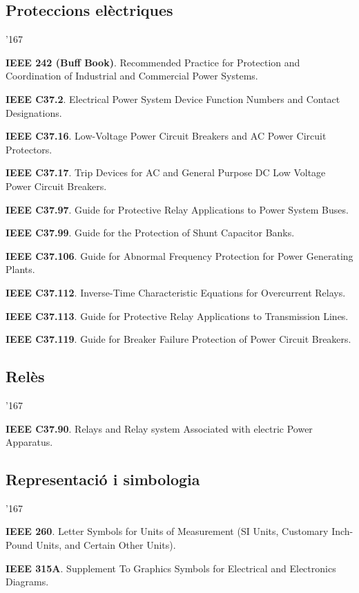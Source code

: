 \subsection*{Proteccions el\`{e}ctriques}
\begin{dinglist}{'167}
    \item \textbf{IEEE 242 (Buff Book)}. Recommended Practice for Protection and Coordination of Industrial and Commercial Power Systems.
    \item \textbf{IEEE C37.2}. Electrical Power System Device Function Numbers and Contact Designations.
    \item \textbf{IEEE C37.16}. Low-Voltage Power Circuit Breakers and AC Power Circuit Protectors.
    \item \textbf{IEEE C37.17}. Trip Devices for AC and General Purpose DC Low Voltage Power Circuit Breakers.
    \item \textbf{IEEE C37.97}. Guide for Protective Relay Applications to Power System Buses.
    \item \textbf{IEEE C37.99}. Guide for the Protection of Shunt Capacitor Banks.
    \item \textbf{IEEE C37.106}. Guide for Abnormal Frequency Protection for Power Generating Plants.
    \item \textbf{IEEE C37.112}. Inverse-Time Characteristic Equations for Overcurrent Relays.
    \item \textbf{IEEE C37.113}. Guide for Protective Relay Applications to Transmission Lines.
    \item \textbf{IEEE C37.119}. Guide for Breaker Failure Protection of Power Circuit Breakers.
\end{dinglist}


\subsection*{Rel\`{e}s}
\begin{dinglist}{'167}
    \item \textbf{IEEE C37.90}. Relays and Relay system Associated with electric Power Apparatus.
\end{dinglist}


\subsection*{Representaci\'{o} i simbologia}
\begin{dinglist}{'167}
    \item \textbf{IEEE 260}. Letter Symbols for Units of Measurement (SI Units, Customary Inch-Pound Units, and Certain Other Units).
    \item \textbf{IEEE 315A}. Supplement To Graphics Symbols for Electrical and Electronics Diagrams.
\end{dinglist}


